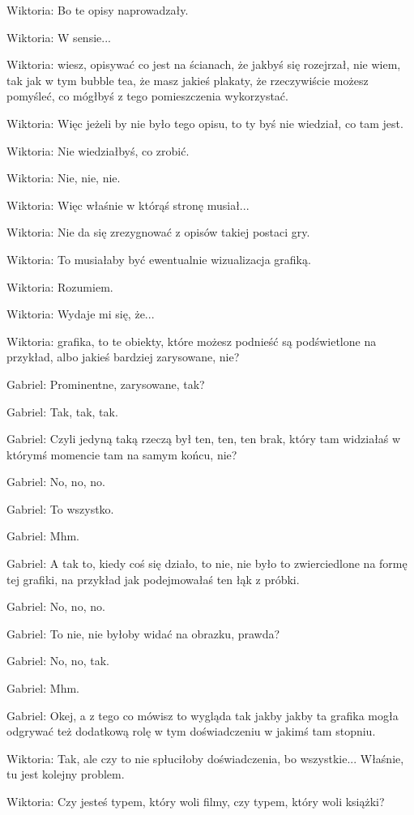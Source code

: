 Wiktoria: Bo te opisy naprowadzały.

Wiktoria: W sensie...

Wiktoria: wiesz, opisywać co jest na ścianach, że jakbyś się rozejrzał, nie wiem, tak jak w tym bubble tea, że masz jakieś plakaty, że rzeczywiście możesz pomyśleć, co mógłbyś z tego pomieszczenia wykorzystać.

Wiktoria: Więc jeżeli by nie było tego opisu, to ty byś nie wiedział, co tam jest.

Wiktoria: Nie wiedziałbyś, co zrobić.

Wiktoria: Nie, nie, nie.

Wiktoria: Więc właśnie w którąś stronę musiał...

Wiktoria: Nie da się zrezygnować z opisów takiej postaci gry.

Wiktoria: To musiałaby być ewentualnie wizualizacja grafiką.

Wiktoria: Rozumiem.

Wiktoria: Wydaje mi się, że...

Wiktoria: grafika, to te obiekty, które możesz podnieść są podświetlone na przykład, albo jakieś bardziej zarysowane, nie?

Gabriel: Prominentne, zarysowane, tak?

Gabriel: Tak, tak, tak.

Gabriel: Czyli jedyną taką rzeczą był ten, ten, ten brak, który tam widziałaś w którymś momencie tam na samym końcu, nie?

Gabriel: No, no, no.

Gabriel: To wszystko.

Gabriel: Mhm.

Gabriel: A tak to, kiedy coś się działo, to nie, nie było to zwierciedlone na formę tej grafiki, na przykład jak podejmowałaś ten łąk z próbki.

Gabriel: No, no, no.

Gabriel: To nie, nie byłoby widać na obrazku, prawda?

Gabriel: No, no, tak.

Gabriel: Mhm.

Gabriel: Okej, a z tego co mówisz to wygląda tak jakby jakby ta grafika mogła odgrywać też dodatkową rolę w tym doświadczeniu w jakimś tam stopniu.

Wiktoria: Tak, ale czy to nie spłuciłoby doświadczenia, bo wszystkie... Właśnie, tu jest kolejny problem.

Wiktoria: Czy jesteś typem, który woli filmy, czy typem, który woli książki?

